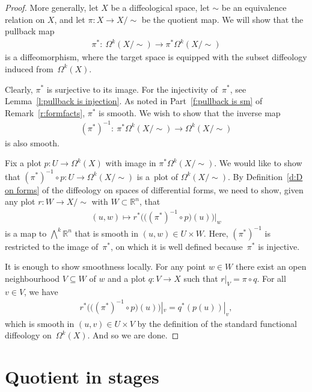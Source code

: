 \documentclass[11pt]{article}
\numberwithin{equation}{section}
\newcommand{\RR}{{\mathbb{R}}} %
\newcommand{\hypref}[2]{{#2~\ref{#1}}}
\begin{document}
\begin{proof}
More generally,
let $X$ be a dif\/feological space, let $\sim$ be an equivalence relation
on $X$, and let $\pi \colon X \to X/\!\!\sim$ be the quotient map.
We will show that the pullback map
\begin{gather*} \pi^* \colon \ \Omega^k(X/\!\!\sim) \to \pi^*\Omega^k(X/\!\!\sim) \end{gather*}
is a dif\/feomorphism,
where the target space is equipped with the subset dif\/feology
induced \linebreak from~$\Omega^k(X)$.

Clearly, $\pi^*$ is surjective to its image.
For the injectivity of~$\pi^*$, see \hypref{l:pullback is injection}{Lemma}.
As noted in Part~\eqref{f:pullback is sm} of \hypref{r:formfacts}{Remark},
$\pi^*$ is smooth.
We wish to show that the inverse map
\begin{gather*} (\pi^*)^{-1} \colon \ \pi^*\Omega^k(X/\!\!\sim) \to \Omega^k(X/\!\!\sim) \end{gather*}
is also smooth.

Fix a plot $p \colon U \to \Omega^k(X)$
with image in $\pi^*\Omega^k(X/\!\!\sim)$.
We would like to show
that $(\pi^*)^{-1} \circ p \colon U \to \Omega^k(X/\!\!\sim)$
is a~plot of $\Omega^k(X/\!\!\sim)$.
By \hypref{d:D on forms}{Def\/inition} of the dif\/feology
on spaces of dif\/ferential forms,
we need to show, given any plot $r \colon W \to X/\!\!\sim$
with $W \subset \RR^n$, that
\begin{gather*} (u,w)\mapsto r^* \big( \big( (\pi^*)^{-1} \circ p \big) (u) \big)\big|_w \end{gather*}
is a map to $\bigwedge^k \RR^n$ that is smooth in $(u,w) \in U \times W$.
Here, $(\pi^*)^{-1}$ is restricted to the image of~$\pi^*$,
on which it is well def\/ined because~$\pi^*$ is injective.

It is enough to show smoothness locally.
For any point $w\in W$ there exist an open neighbourhood $V\subseteq W$ of $w$
and a plot $q \colon V\to X$ such that $r|_V = \pi\circ q$.
For all $v\in V$, we have
\begin{gather*} r^* \big( \big((\pi^*)^{-1}\circ p\big)(u) \big)|_v = q^*(p(u))|_v,\end{gather*}
which is smooth in $(u,v) \in U \times V$
by the def\/inition of the standard functional dif\/feology on~$\Omega^k(X)$.
And so we are done.
\end{proof}

\section{Quotient in stages}\label{sec:q in stages}
\end{document}
